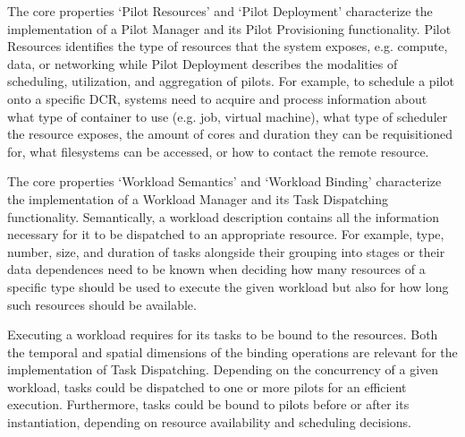 \documentclass{sig-alternate}
\begin{document}
The core properties `Pilot Resources' and `Pilot Deployment' characterize the
implementation of a Pilot Manager and its Pilot Provisioning functionality.
Pilot Resources identifies the type of resources that the \pilot system exposes,
e.g. compute, data, or networking while Pilot Deployment describes the
modalities of scheduling, utilization, and aggregation of pilots. For example,
to schedule a pilot onto a specific DCR, \pilot systems need to acquire and
process information about what type of container to use (e.g. job, virtual
machine), what type of scheduler the resource exposes, the amount of cores and
duration they can be requisitioned for, what filesystems can be accessed, or how
to contact the remote resource.

 

 

The core properties `Workload Semantics' and `Workload Binding' characterize the
implementation of a Workload Manager and its Task Dispatching functionality.
Semantically, a workload description contains all the information necessary for
it to be dispatched to an appropriate resource.  For example, type, number,
size, and duration of tasks alongside their grouping into stages or their data
dependences need to be known when deciding how many resources of a specific type
should be used to execute the given workload but also for how long such
resources should be available.

Executing a workload requires for its tasks to be bound to the resources. Both
the temporal and spatial dimensions of the binding operations are relevant for
the implementation of Task Dispatching. Depending on the concurrency of a given
workload, tasks could be dispatched to one or more pilots for an efficient
execution. Furthermore, tasks could be bound to pilots before or after its
instantiation, depending on resource availability and scheduling decisions.
\end{document}
